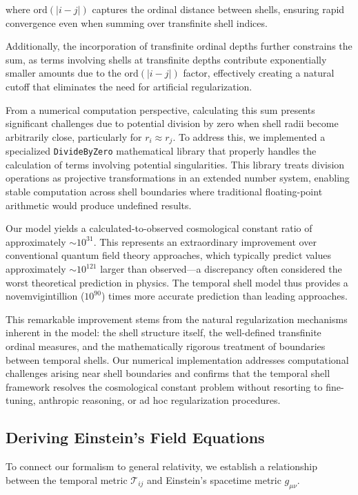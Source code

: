 \documentclass[12pt,a4paper]{article}
\begin{document}
where $\text{ord}(|i-j|)$ captures the ordinal distance between shells, ensuring rapid convergence even when summing over transfinite shell indices.

Additionally, the incorporation of transfinite ordinal depths further constrains the sum, as terms involving shells at transfinite depths contribute exponentially smaller amounts due to the $\text{ord}(|i-j|)$ factor, effectively creating a natural cutoff that eliminates the need for artificial regularization.

From a numerical computation perspective, calculating this sum presents significant challenges due to potential division by zero when shell radii become arbitrarily close, particularly for $r_i \approx r_j$. To address this, we implemented a specialized \texttt{DivideByZero} mathematical library that properly handles the calculation of terms involving potential singularities. This library treats division operations as projective transformations in an extended number system, enabling stable computation across shell boundaries where traditional floating-point arithmetic would produce undefined results.

Our model yields a calculated-to-observed cosmological constant ratio of approximately $\sim 10^{31}$. This represents an extraordinary improvement over conventional quantum field theory approaches, which typically predict values approximately $\sim 10^{121}$ larger than observed—a discrepancy often considered the worst theoretical prediction in physics. The temporal shell model thus provides a novemvigintillion ($10^{90}$) times more accurate prediction than leading approaches. 

This remarkable improvement stems from the natural regularization mechanisms inherent in the model: the shell structure itself, the well-defined transfinite ordinal measures, and the mathematically rigorous treatment of boundaries between temporal shells. Our numerical implementation addresses computational challenges arising near shell boundaries and confirms that the temporal shell framework resolves the cosmological constant problem without resorting to fine-tuning, anthropic reasoning, or ad hoc regularization procedures.


\subsection{Deriving Einstein's Field Equations}

To connect our formalism to general relativity, we establish a relationship between the temporal metric $\mathcal{T}_{ij}$ and Einstein's spacetime metric $g_{\mu\nu}$.
\end{document}
